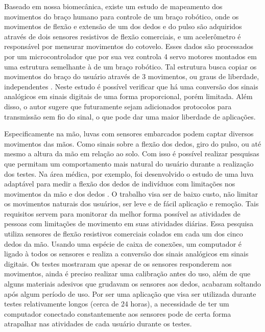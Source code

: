 \documentclass[
	12pt,				%
	openright,			%
	oneside,			%
	a4paper,			%
	english,			%
	brazil				%
	]{abntex2}
\begin{document}
		Baseado em nossa biomecânica, existe um estudo de mapeamento dos movimentos do braço humano para controle de um braço robótico, onde os movimentos de flexão e extensão de um dos dedos e do pulso são adquiridos através de dois sensores resistivos de flexão comerciais, e um acelerômetro é responsável por mensurar movimentos do cotovelo. Esses dados são processados por um microcontrolador que por sua vez controla 4 servo motores montados em uma estrutura semelhante à de um braço robótico. Tal estrutura busca copiar os movimentos do braço do usuário através de 3 movimentos, ou graus de liberdade, independentes \cite{syed2012armcontroller}. Neste estudo é possível verificar que há uma conversão dos sinais analógicos em sinais digitais de uma forma proporcional, porém limitada. Além disso, o autor sugere que futuramente sejam adicionados protocolos para transmissão sem fio do sinal, o que pode dar uma maior liberdade de aplicações.
		
		Especificamente na mão, luvas com sensores embarcados podem captar diversos movimentos das mãos. Como sinais sobre a flexão dos dedos, giro do pulso, ou até mesmo a altura da mão em relação ao solo. Com isso é possível realizar pesquisas que permitam um comportamento mais natural do usuário durante a realização dos testes. Na área médica, por exemplo, foi desenvolvido o estudo de uma luva adaptável para medir a flexão dos dedos de indivíduos com limitações nos movimentos da mão e dos dedos \cite{simone2004lowcost}. O trabalho visa ser de baixo custo, não limitar os movimentos naturais dos usuários, ser leve e de fácil aplicação e remoção. Tais requisitos servem para monitorar da melhor forma possível as atividades de pessoas com limitações de movimento em suas atividades diárias. Essa pesquisa utiliza sensores de flexão resistivos comerciais colados em cada um dos cinco dedos da mão. Usando uma espécie de caixa de conexões, um computador é ligado à todos os sensores e realiza a conversão dos sinais analógicos em sinais digitais. Os testes mostraram que apesar de os sensores responderem aos movimentos, ainda é preciso realizar uma calibração antes do uso, além de que alguns materiais adesivos que grudavam os sensores aos dedos, acabaram soltando após algum período de uso. Por ser uma aplicação que visa ser utilizada durante testes relativamente longos (cerca de 24 horas), a necessidade de ter um computador conectado constantemente aos sensores pode de certa forma atrapalhar nas atividades de cada usuário durante os testes.		
		
\end{document}
